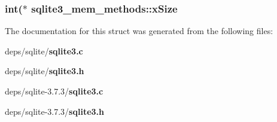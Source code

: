 \subsubsection{\setlength{\rightskip}{0pt plus 5cm}int($\ast$ \bf{sqlite3\_\-mem\_\-methods::x\-Size}}\label{structsqlite3__mem__methods_a867566f24ea8266b8bfba20f8983318}




The documentation for this struct was generated from the following files:\begin{CompactItemize}
\item 
deps/sqlite/\bf{sqlite3.c}\item 
deps/sqlite/\bf{sqlite3.h}\item 
deps/sqlite-3.7.3/\bf{sqlite3.c}\item 
deps/sqlite-3.7.3/\bf{sqlite3.h}\end{CompactItemize}
